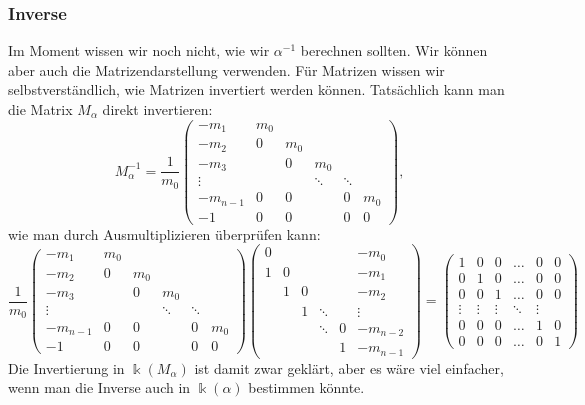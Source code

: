 \subsubsection{Inverse}
Im Moment wissen wir noch nicht, wie wir $\alpha^{-1}$ berechnen sollten.
Wir können aber auch die Matrizendarstellung verwenden.
Für Matrizen wissen wir selbstverständlich, wie Matrizen invertiert
werden können.
Tatsächlich kann man die Matrix $M_\alpha$ direkt invertieren:
\[
M_\alpha^{-1}
=
\frac{1}{m_0}
\begin{pmatrix}
   -m_1 &m_0&   &      &      &   \\
   -m_2 & 0 &m_0&      &      &   \\
   -m_3 &   & 0 &   m_0&      &   \\
 \vdots &   &   &\ddots&\ddots&   \\
-m_{n-1}& 0 & 0 &      &  0   &m_0\\
    -1  & 0 & 0 &      &  0   & 0
\end{pmatrix},
\]
wie man durch Ausmultiplizieren überprüfen kann:
\[
\frac{1}{m_0}
\begin{pmatrix}
   -m_1 &m_0&   &      &      &   \\
   -m_2 & 0 &m_0&      &      &   \\
   -m_3 &   & 0 &   m_0&      &   \\
 \vdots &   &   &\ddots&\ddots&   \\
-m_{n-1}& 0 & 0 &      &  0   &m_0\\
    -1  & 0 & 0 &      &  0   & 0
\end{pmatrix}
\begin{pmatrix}
  0   &    &    &      &   &-m_0    \\
  1   & 0  &    &      &   &-m_1    \\
      & 1  & 0  &      &   &-m_2    \\
      &    & 1  &\ddots&   &\vdots  \\
      &    &    &\ddots& 0 &-m_{n-2}\\
      &    &    &      & 1 &-m_{n-1}
\end{pmatrix}
=
\begin{pmatrix}
1&0&0&\dots&0&0\\
0&1&0&\dots&0&0\\
0&0&1&\dots&0&0\\
\vdots&\vdots&\vdots&\ddots&\vdots\\
0&0&0&\dots&1&0\\
0&0&0&\dots&0&1
\end{pmatrix}
\]
Die Invertierung in $\Bbbk(M_\alpha)$ ist damit zwar geklärt, aber
es wäre viel einfacher, wenn man die Inverse auch in $\Bbbk(\alpha)$
bestimmen könnte.

